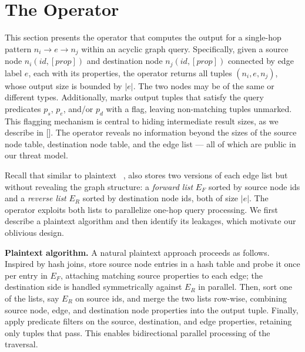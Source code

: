 \section{The \Onehop Operator}
\label{sec:onehop}


This section presents the \onehop operator that computes the output for a 
single-hop pattern $n_i \rightarrow e \rightarrow n_j$ within an acyclic 
graph query. Specifically, given a source node $n_i(id, [prop])$ and destination 
node $n_j(id, [prop])$ connected by edge label $e$, each with its properties, 
the \onehop operator returns all tuples $(n_i, e, n_j)$, whose output size is 
bounded by $|e|$. The two nodes may be of the same or different types.
Additionally, \onehop marks output tuples that satisfy the query predicates 
$p_s$, $p_e$, and/or $p_d$ with a flag, leaving non-matching tuples unmarked. 
This flagging mechanism is central to hiding intermediate result sizes, as we 
describe in []. The \onehop operator reveals no information 
beyond the sizes of the source node table, destination node table, and the 
edge list --- all of which are public in our threat model.


Recall that similar to plaintext \gdbs~\cite{janusgraph, feng2023kuzu, 
deutsch2019tigergraph, sun2015sqlgraph}, \system also stores two versions of each 
edge list but without revealing the graph structure: a \textit{forward list} 
$E_F$ sorted by source node ids and a \textit{reverse list} $E_R$ sorted by 
destination node ids, both of size $|e|$.
The \onehop operator exploits both lists to parallelize one-hop query 
processing. We first describe a plaintext algorithm and then identify its 
leakages, which motivate our oblivious design.


\noindent\textbf{Plaintext algorithm.}
A natural plaintext approach proceeds as follows. Inspired by hash joins, 
store source node entries in a hash table and probe it once per entry in 
$E_F$, attaching matching source properties to each edge; the destination side
is handled symmetrically against $E_R$ in parallel. Then, sort one of the lists,
say $E_R$ on source ids, and merge the two lists row-wise, combining source node,
edge, and destination node properties into the output tuple. Finally, apply 
predicate filters on the source, destination, and edge properties, retaining 
only tuples that pass. This enables bidirectional parallel processing of the 
traversal.

